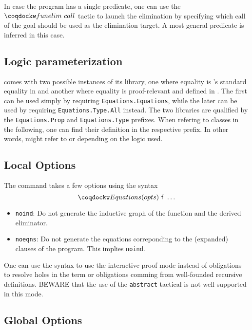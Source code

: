 In case the program has a single predicate, one can use the
$\tac{funelim}~call$ tactic to launch the elimination by specifying
which call of the goal should be used as the elimination target.
A most general predicate is inferred in this case.

\subsection{Logic parameterization}

\Equations comes with two possible instances of its library,
one where equality is \Coq's standard equality  in \Prop and
another where equality is proof-relevant and defined in .
The first can be used simply by requiring \texttt{Equations.Equations},
while the later can be used by requiring \texttt{Equations.Type.All}
instead. The two libraries are qualified by the \texttt{Equations.Prop} and
\texttt{Equations.Type} prefixes. When refering to classes in the
following, one can find their definition in the respective prefix. In
other words,
 might refer to 
or  depending on the logic used.

\subsection{Local Options}
The  command takes a few options using the syntax
\[\kw{Equations}(opts)~\cst{f}~\ldots\]

\begin{itemize}
\item \texttt{noind}: Do not generate the inductive graph of the
  function and the derived eliminator.
\item \texttt{noeqns}: Do not generate the equations correponding to the
  (expanded) clauses of the program. This implies \texttt{noind}.
\end{itemize}

One can use the  syntax to use the interactive proof mode
instead of obligations to resolve holes in the term or obligations
comming from well-founded recursive definitions. BEWARE that the use
of the \texttt{abstract} tactical is not well-supported in this mode.

\subsection{Global Options}

